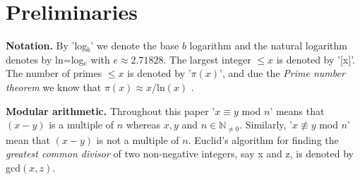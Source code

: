 \section{Preliminaries}
{\bf Notation.} By 'log$_b$' we denote the base $b$ logarithm and the natural logarithm denotes by ln=log$_e$ with $e \approx 2.71828$. 
The largest integer $\leq x$ is denoted by '[x]'.  The number of primes $\leq x$ is denoted by '$\pi(x)$', and due the \emph{Prime number theorem}\cite{Hardy2008}
we know that $\pi(x) \approx x / $ln$(x)$ .

{\bf Modular arithmetic.} Throughout this paper '$x \equiv y$ mod $n$' means that $(x-y)$ is a multiple of $n$ whereas $x,y$ and $n \in \mathbb{N}_{\ne 0}$.
Similarly, '$x \not\equiv y$ mod $n$' mean that $(x-y)$ is not a multiple of $n$. 
Euclid's algorithm for finding the \emph{greatest common divisor} of two non-negative integers, say x and z, is denoted by gcd$(x,z)$.
